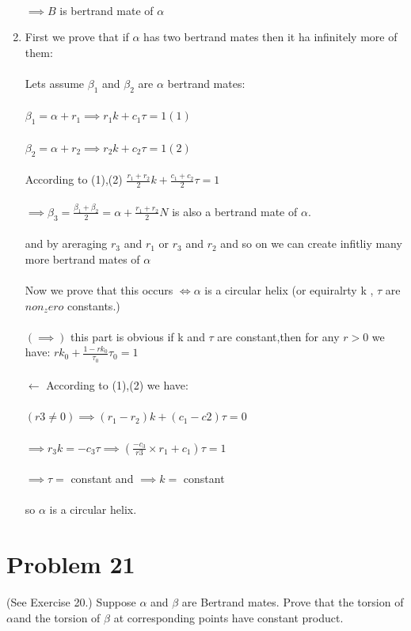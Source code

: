 \documentclass[
	12pt, %
]{fphw}
\theoremstyle{plain}
\begin{document}
\begin{enumerate}
       \\ $\implies B$ is bertrand mate of $\alpha$\\
     \item First we prove that if $\alpha$ has two bertrand mates then it ha infinitely more of them:\\
       \\Lets assume $\beta_1$ and  $\beta_2$ are $\alpha$ bertrand mates:\\
       \\ $\beta_1 = \alpha + r_1  \implies r_1 k + c_1 \tau = 1 (1)$\\
       \\ $\beta_2 = \alpha + r_2  \implies r_2 k + c_2 \tau = 1 (2)$\\
       \\ According to (1),(2) $\frac{r_1 + r_2}{2}k + \frac{c_1 + c_2}{2}\tau = 1$\\
       \\ $\implies \beta_3 = \frac{\beta_1 + \beta_2}{2} = \alpha + \frac{r_1 + r_2}{2}N$ is also a bertrand mate of $\alpha$.\\
       \\and by areraging $r_3$ and $r_1$ or $r_3$ and $r_2$ and so on we can create infitliy many more bertrand mates of $\alpha$\\
       \\Now we prove that this occurs $\iff \alpha$ is a circular helix (or equiralrty k , $\tau$ are $non_zero$ constants.)\\
       \\$(\implies)$ this part is obvious if k and $\tau$ are constant,then for any $r > 0$ we have: $r k_0 + \frac{1-rk_0}{\tau_0}\tau_0 = 1$\\
       \\$\longleftarrow$ According to (1),(2)  we have:\\
       \\$(r3 \neq 0) \implies(r_1 - r_2)k + (c_1 - c2)\tau = 0$\\
       \\$ \implies r_3 k = -c_3 \tau \implies (\frac{-c_3}{r3} \times r_1 + c_1)\tau = 1$\\
       \\$ \implies \tau =$ constant and $ \implies k =$ constant\\
       \\ so $\alpha$ is a circular helix.
\end{enumerate}

\section*{Problem 21}
\begin{problem}
     (See Exercise 20.) Suppose $\alpha$ and $\beta$ are Bertrand mates. Prove that the torsion of $\alpha$and the torsion of
      $\beta$ at corresponding points have constant product.
\end{problem}
\end{document}
